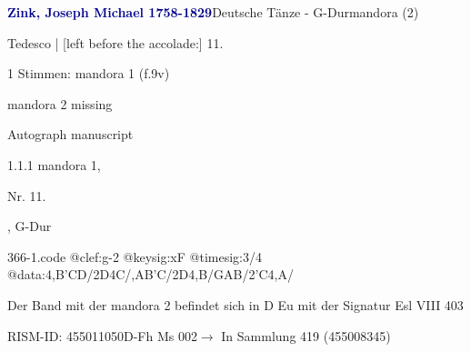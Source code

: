 \documentclass[twocolumn]{book}
\begin{document}
\par \vspace{7pt} \textcolor{darkblue}{\textbf{Zink, Joseph Michael  1758-1829}}\hfillplus{\textbf{[366]}}\newline Deutsche Tänze - G-Dur\newline mandora (2)
\par \begin{itshape}[f.9v, at left:] Tedesco | [left before the accolade:] 11.\end{itshape} 
\par \textcolor{darkblue}{}  1 Stimmen: mandora 1  (f.9v)\newline \begin{small} mandora 2 missing\end{small} \newline Autograph manuscript
\par 1.1.1  mandora 1, \begin{itshape}Nr. 11.\end{itshape}, G-Dur  
\begin{filecontents*}{366-1.code}
@clef:g-2
@keysig:xF
@timesig:3/4
@data:4,B'CD/2D4C/,AB'C/2D4,B/GAB/2'C4,A/
\end{filecontents*}
\newline
%
\par Der Band mit der mandora 2 befindet sich in D Eu mit der Signatur Esl VIII 403
\par RISM-ID: 455011050\newline D-Fh  Ms 002\newline $\rightarrow$ In Sammlung 419 (455008345)
      
\end{document}
